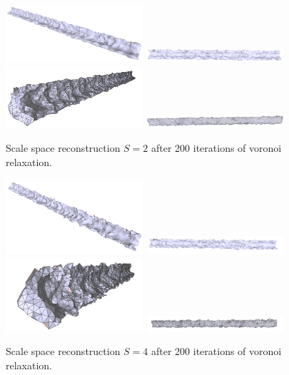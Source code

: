 \documentclass[12pt]{drexelthesis}
\begin{document}
\begin{figure}[!ht]
	\centering
		\includegraphics[width=2in]{simulated-lab-scan/2cmnoise/optimized/scalespace2Lloyd30s200it00.png}
		\includegraphics[width=2in]{simulated-lab-scan/2cmnoise/optimized/scalespace2Lloyd30s200it01.png}
		\includegraphics[width=2in]{simulated-lab-scan/2cmnoise/optimized/scalespace2Lloyd30s200it02.png}
		\includegraphics[width=2in]{simulated-lab-scan/2cmnoise/optimized/scalespace2Lloyd30s200it03.png}
		\caption[Scale space reconstruction $S = 2$ after 200 iterations of voronoi relaxation]{\centering Scale space reconstruction $S = 2$ after 200 iterations of voronoi relaxation.}
	\label{2cmnoise:scalespace2lloyd}
\end{figure}




\begin{figure}[!ht]
	\centering
		\includegraphics[width=2in]{simulated-lab-scan/2cmnoise/optimized/scalespace4Lloyd30s200it00.png}
		\includegraphics[width=2in]{simulated-lab-scan/2cmnoise/optimized/scalespace4Lloyd30s200it01.png}
		\includegraphics[width=2in]{simulated-lab-scan/2cmnoise/optimized/scalespace4Lloyd30s200it02.png}
		\includegraphics[width=2in]{simulated-lab-scan/2cmnoise/optimized/scalespace4Lloyd30s200it03.png}
		\caption[Scale space reconstruction $S = 4$ after 200 iterations of voronoi relaxation]{\centering Scale space reconstruction $S = 4$ after 200 iterations of voronoi relaxation.}
	\label{2cmnoise:scalespace4lloyd}
\end{figure}
\end{document}
